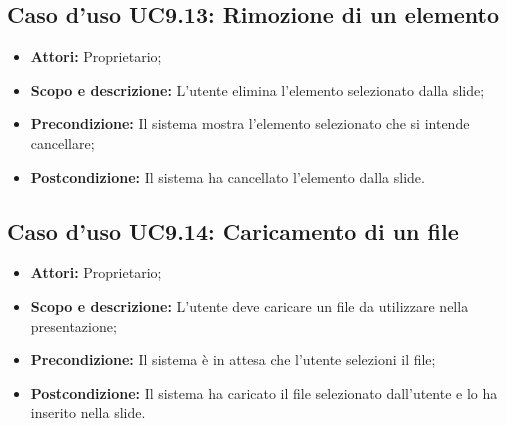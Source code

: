 \subsection{Caso d'uso UC9.13: Rimozione di un elemento}
\begin{itemize}
	\item \textbf{Attori:} Proprietario;
	\item \textbf{Scopo e descrizione:} L'utente elimina l'elemento selezionato dalla \gls{slide};
	\item \textbf{Precondizione:} Il sistema mostra l'elemento selezionato che si intende cancellare;
	\item \textbf{Postcondizione:} Il sistema ha cancellato l'elemento dalla \gls{slide}.
\end{itemize}


\subsection{Caso d'uso UC9.14: Caricamento di un file}
\begin{itemize}
	\item \textbf{Attori:} Proprietario;
	\item \textbf{Scopo e descrizione:} L'utente deve caricare un file da utilizzare nella presentazione;
	\item \textbf{Precondizione:} Il sistema è in attesa che l'utente selezioni il file;
	\item \textbf{Postcondizione:} Il sistema ha caricato il file selezionato dall'utente e lo ha inserito nella \gls{slide}.
\end{itemize}

\newpage
